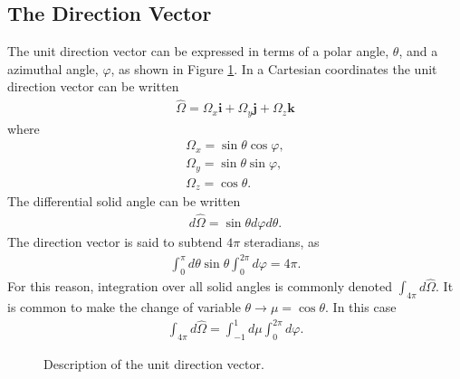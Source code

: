 \documentclass[11pt]{article}
\renewcommand\vec{\mathbf}
\begin{document}
\subsection{The Direction Vector}
\label{sec:orgheadline52}
The unit direction vector can be expressed in terms of a polar angle, \(\theta\), and a azimuthal angle, \(\varphi\), as shown in Figure \ref{fig::unitDirection}.  In a Cartesian coordinates the unit direction vector can be written
\begin{align}
  \hat{\Omega} = \Omega_x \vec{i} + \Omega_y \vec{j} + \Omega_z \vec{k}
\end{align} 
where
\begin{subequations}
\begin{align}
  \Omega_x = \sin\theta \cos\varphi, \\
  \Omega_y = \sin\theta \sin\varphi, \\
  \Omega_z = \cos\theta.
\end{align}
\end{subequations}
The differential solid angle can be written
\begin{align}
  d\hat{\Omega} = \sin\theta d\varphi d\theta.
\end{align}
The direction vector is said to subtend \(4\pi\) steradians, as
\begin{align}
  \int_0^\pi d\theta \sin\theta \int_0^{2\pi} d\varphi = 4\pi.
\end{align}
For this reason, integration over all solid angles is commonly denoted \(\int_{4\pi} d\hat{\Omega}\).
It is common to make the change of variable \(\theta \rightarrow \mu = \cos\theta\).  In this case
\begin{align}
  \int_{4\pi} d\hat{\Omega} = \int_{-1}^1 d\mu \int_0^{2\pi} d\varphi.
\end{align}

\begin{figure}
\centering
{}
\caption{Description of the unit direction vector.}
\label{fig::unitDirection}
\end{figure}
\end{document}
